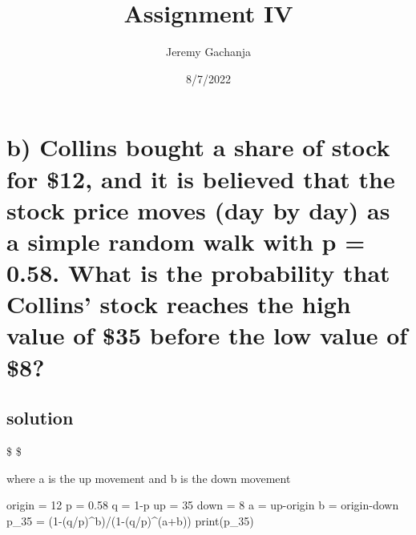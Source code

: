\documentclass[
]{article}
\title{Assignment IV}
\author{Jeremy Gachanja}
\date{8/7/2022}
\newenvironment{Shaded}{\begin{snugshade}}{\end{snugshade}}
\newcommand{\DecValTok}[1]{\textcolor[rgb]{0.00,0.00,0.81}{#1}}
\newcommand{\FloatTok}[1]{\textcolor[rgb]{0.00,0.00,0.81}{#1}}
\newcommand{\FunctionTok}[1]{\textcolor[rgb]{0.00,0.00,0.00}{#1}}
\newcommand{\NormalTok}[1]{#1}
\newcommand{\OtherTok}[1]{\textcolor[rgb]{0.56,0.35,0.01}{#1}}
\newcommand{\SpecialCharTok}[1]{\textcolor[rgb]{0.00,0.00,0.00}{#1}}
\begin{document}
\maketitle

\hypertarget{b-collins-bought-a-share-of-stock-for-12-and-it-is-believed-that-the-stock-price-moves-day-by-day-as-a-simple-random-walk-with-p-0.58.-what-is-the-probability-that-collins-stock-reaches-the-high-value-of-35-before-the-low-value-of-8}{%
\section{b) Collins bought a share of stock for \$12, and it is believed
that the stock price moves (day by day) as a simple random walk with p =
0.58. What is the probability that Collins' stock reaches the high value
of \$35 before the low value of
\$8?}\label{b-collins-bought-a-share-of-stock-for-12-and-it-is-believed-that-the-stock-price-moves-day-by-day-as-a-simple-random-walk-with-p-0.58.-what-is-the-probability-that-collins-stock-reaches-the-high-value-of-35-before-the-low-value-of-8}}

\hypertarget{solution}{%
\subsection{solution}\label{solution}}

\$ \$

where a is the up movement and b is the down movement

\begin{Shaded}
\begin{Highlighting}[]
\NormalTok{origin }\OtherTok{=} \DecValTok{12}
\NormalTok{p }\OtherTok{=} \FloatTok{0.58}
\NormalTok{q }\OtherTok{=} \DecValTok{1}\SpecialCharTok{{-}}\NormalTok{p}
\NormalTok{up }\OtherTok{=} \DecValTok{35}
\NormalTok{down }\OtherTok{=} \DecValTok{8}
\NormalTok{a }\OtherTok{=}\NormalTok{ up}\SpecialCharTok{{-}}\NormalTok{origin}
\NormalTok{b }\OtherTok{=}\NormalTok{ origin}\SpecialCharTok{{-}}\NormalTok{down}
\NormalTok{p\_35 }\OtherTok{=}\NormalTok{ (}\DecValTok{1}\SpecialCharTok{{-}}\NormalTok{(q}\SpecialCharTok{/}\NormalTok{p)}\SpecialCharTok{\^{}}\NormalTok{b)}\SpecialCharTok{/}\NormalTok{(}\DecValTok{1}\SpecialCharTok{{-}}\NormalTok{(q}\SpecialCharTok{/}\NormalTok{p)}\SpecialCharTok{\^{}}\NormalTok{(a}\SpecialCharTok{+}\NormalTok{b))}
\FunctionTok{print}\NormalTok{(p\_35)}
\end{Highlighting}
\end{Shaded}
\end{document}
